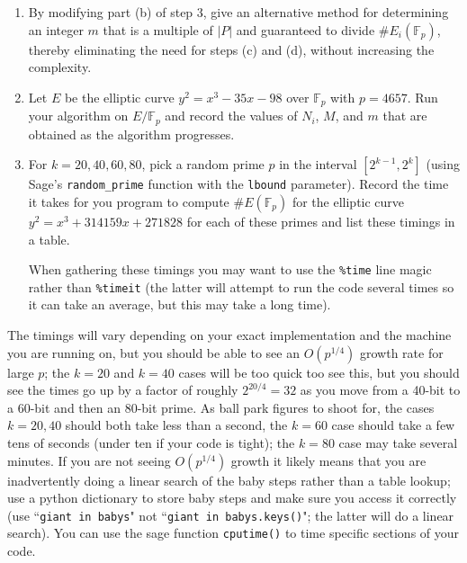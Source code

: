 \documentclass[11pt]{article}
\newcommand{\Fp}{\mathbb{F}_p}
\begin{document}
\begin{enumerate}[{\bf (a)}]
\item By modifying part (b) of step 3, give an alternative method for determining an integer $m$ that is a multiple of $|P|$ and guaranteed to divide $\#E_i(\Fp)$, thereby eliminating the need for steps (c) and (d), without increasing the complexity.
\item
Let $E$ be the elliptic curve $y^2=x^3-35x-98$ over $\Fp$ with $p=4657$.
Run your algorithm on $E/\Fp$ and record the values of $N_i$, $M$, and $m$ that are obtained as the algorithm progresses.
\item
For $k=20,40,60,80$, pick a random prime $p$ in the interval $[2^{k-1},2^{k}]$ (using Sage's \texttt{random\_prime} function with the \texttt{lbound} parameter).  Record the time it takes for you program to compute $\#E(\Fp)$ for the elliptic curve $y^2=x^3+314159x+271828$ for each of these primes and list these timings in a table.

When gathering these timings you may want to use the \texttt{\%time} line magic rather than \texttt{\%timeit} (the latter will attempt to run the code several times so it can take an average, but this may take a long time).
\end{enumerate}

The timings will vary depending on your exact implementation and the machine you are running on, but you should be able to see an $O(p^{1/4})$ growth rate for large $p$; the $k=20$ and $k=40$ cases will be too quick too see this, but you should see the times go up by a factor of roughly $2^{20/4}=32$ as you move from a 40-bit to a 60-bit and then an 80-bit prime.  As ball park figures to shoot for, the cases $k=20,40$ should both take less than a second, the $k=60$ case should take a few tens of seconds (under ten if your code is tight); the $k=80$ case may take several minutes.
If you are not seeing $O(p^{1/4})$ growth it likely means that you are inadvertently doing a linear search of the baby steps rather than a table lookup; use a python dictionary to store baby steps and make sure you access it correctly (use ``\texttt{giant in babys}" not ``\texttt{giant in babys.keys()}"; the latter will do a linear search).  You can use the sage function \texttt{cputime()} to time specific sections of your code.
\end{document}

